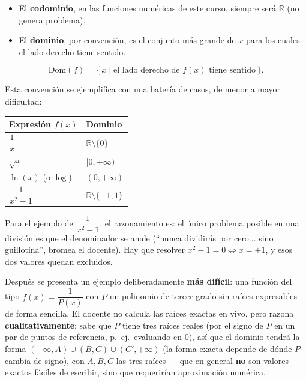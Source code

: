 \documentclass[12pt,a4paper]{article}
\begin{document}
\begin{itemize}
  \item El \textbf{codominio}, en las funciones numéricas de este curso, siempre será $\mathbb{R}$ (no genera problema).
  \item El \textbf{dominio}, por convención, es el conjunto más grande de $x$ para los cuales el lado derecho tiene sentido.
\end{itemize}

\begin{keybox}
$$\boxed{\mathrm{Dom}(f) = \{\, x \mid \text{el lado derecho de } f(x) \text{ tiene sentido} \,\}.}$$
\end{keybox}

Esta convención se ejemplifica con una batería de casos, de menor a mayor dificultad:

\begin{table}[H]
\centering
\begin{tabular}{@{}ll@{}}
\toprule
Expresión $f(x)$ & Dominio \\
\midrule
$\dfrac{1}{x}$ & $\mathbb{R} \setminus \{0\}$ \\[1.2ex]
$\sqrt{x}$ & $[0, +\infty)$ \\[0.6ex]
$\ln(x)$ (o $\log$) & $(0, +\infty)$ \\[0.6ex]
$\dfrac{1}{x^2-1}$ & $\mathbb{R} \setminus \{-1, 1\}$ \\[0.6ex]
\bottomrule
\end{tabular}
\end{table}

Para el ejemplo de $\dfrac{1}{x^2-1}$, el razonamiento es: el único problema posible en una división es que el denominador se anule (``nunca dividirás por cero... sino guillotina'', bromea el docente). Hay que resolver $x^2 - 1 = 0 \iff x = \pm 1$, y esos dos valores quedan excluidos.

Después se presenta un ejemplo deliberadamente \textbf{más difícil}: una función del tipo $f(x) = \dfrac{1}{P(x)}$ con $P$ un polinomio de tercer grado sin raíces expresables de forma sencilla. El docente no calcula las raíces exactas en vivo, pero razona \textbf{cualitativamente}: sabe que $P$ tiene tres raíces reales (por el signo de $P$ en un par de puntos de referencia, p.\ ej.\ evaluando en $0$), así que el dominio tendrá la forma $(-\infty,A) \cup (B,C) \cup (C',+\infty)$ (la forma exacta depende de dónde $P$ cambia de signo), con $A, B, C$ las tres raíces --- que en general \textbf{no} son valores exactos fáciles de escribir, sino que requerirían aproximación numérica.
\end{document}
